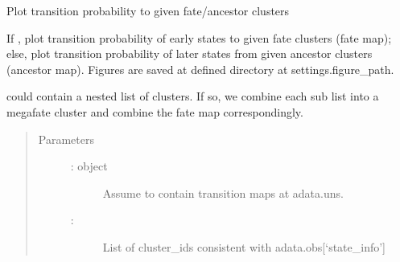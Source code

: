 \documentclass[letterpaper,10pt,english]{sphinxmanual}
\begin{document}
\begin{fulllineitems}
\label{\detokenize{cospar.pl.fate_map:cospar.pl.fate_map}}
Plot transition probability to given fate/ancestor clusters

If , plot transition probability of early
states to given fate clusters (fate map); else, plot transition
probability of later states from given ancestor clusters (ancestor map).
Figures are saved at defined directory at settings.figure\_path.

 could contain a nested list of clusters. If so, we
combine each sub list into a mega\sphinxhyphen{}fate cluster and combine the fate
map correspondingly.
\begin{quote}\begin{description}
\item[{Parameters}] \leavevmode\begin{description}
\item[{ :  object}] \leavevmode
Assume to contain transition maps at adata.uns.

\item[{ : }] \leavevmode
List of cluster\_ids consistent with adata.obs{[}‘state\_info’{]}


\end{description}
\end{description}
\end{quote}
\end{fulllineitems}
\end{document}
